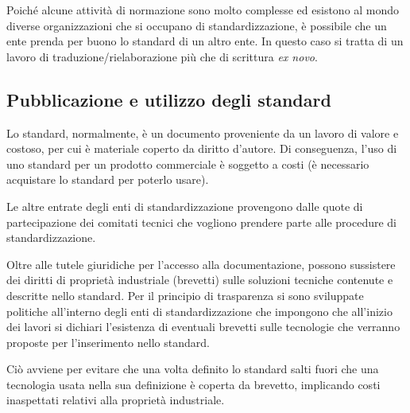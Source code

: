 Poiché alcune attività di normazione sono molto complesse ed esistono al mondo diverse organizzazioni che si occupano di standardizzazione, è possibile che un ente prenda per buono lo standard di un altro ente. 
In questo caso si tratta di un lavoro di traduzione/rielaborazione più che di scrittura \textit{ex novo}.

\subsection{Pubblicazione e utilizzo degli standard}
Lo standard, normalmente, è un documento proveniente da un lavoro di valore e costoso, per cui è materiale coperto da diritto d'autore. Di conseguenza, l'uso di uno standard per un prodotto commerciale è soggetto a costi (è necessario acquistare lo standard per poterlo usare). 

Le altre entrate degli enti di standardizzazione provengono dalle quote di partecipazione dei comitati tecnici che vogliono prendere parte alle procedure di standardizzazione.

Oltre alle tutele giuridiche per l'accesso alla documentazione, possono sussistere dei diritti di proprietà industriale (brevetti) sulle soluzioni tecniche contenute e descritte nello standard. 
Per il principio di trasparenza si sono sviluppate politiche all'interno degli enti di standardizzazione che impongono che all'inizio dei lavori si dichiari l'esistenza di eventuali brevetti sulle tecnologie che verranno proposte per l'inserimento nello standard. 

Ciò avviene per evitare che una volta definito lo standard salti fuori che una tecnologia usata nella sua definizione è coperta da brevetto, implicando costi inaspettati relativi alla proprietà industriale.
